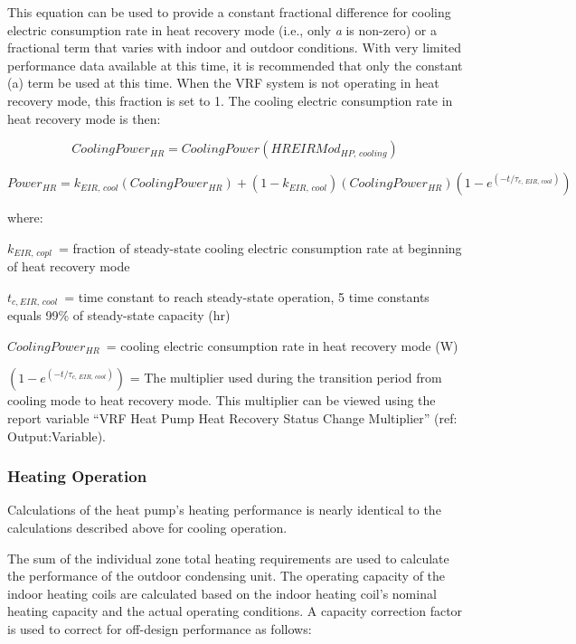 This equation can be used to provide a constant fractional difference for cooling electric consumption rate in heat recovery mode (i.e., only \emph{a} is non-zero) or a fractional term that varies with indoor and outdoor conditions. With very limited performance data available at this time, it is recommended that only the constant (a) term be used at this time. When the VRF system is not operating in heat recovery mode, this fraction is set to 1. The cooling electric consumption rate in heat recovery mode is then:

\begin{equation}
  CoolingPower_{HR} = CoolingPower \left( HREIRMod_{HP,\,cooling} \right)
\end{equation}

\begin{equation}
  Power_{HR} = k_{EIR,\,cool} \left( CoolingPower_{HR} \right) + \left( 1 - k_{EIR,\,cool} \right) \left( CoolingPower_{HR} \right) \left( 1 - e^{\left( -t / \tau_{c,\,EIR,\,cool} \right)} \right)
\end{equation}
  
where:

\(k_{EIR,\, copl}\) = fraction of steady-state cooling electric consumption rate at beginning of heat recovery mode

\(t_{c,EIR,\, cool}\) = time constant to reach steady-state operation, 5 time constants equals 99\% of steady-state capacity (hr)

\(CoolingPower_{HR}\) = cooling electric consumption rate in heat recovery mode (W)

\(\left( 1 - e^{\left( -t / \tau_{c,\,EIR,\,cool} \right)} \right)\) = The multiplier used during the transition period from cooling mode to heat recovery mode. This multiplier can be viewed using the report variable ``VRF Heat Pump Heat Recovery Status Change Multiplier'' (ref: Output:Variable).

\subsubsection{Heating Operation}\label{heating-operation-201605050924}

Calculations of the heat pump's heating performance is nearly identical to the calculations described above for cooling operation.

The sum of the individual zone total heating requirements are used to calculate the performance of the outdoor condensing unit. The operating capacity of the indoor heating coils are calculated based on the indoor heating coil's nominal heating capacity and the actual operating conditions. A capacity correction factor is used to correct for off-design performance as follows:

